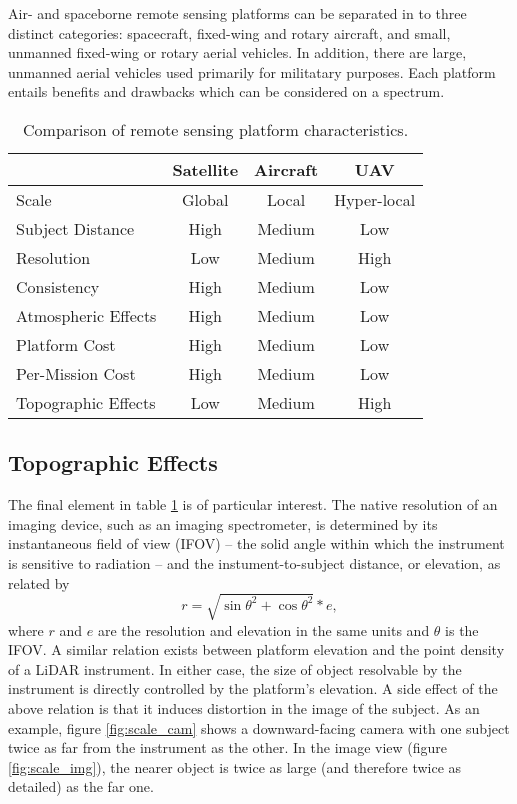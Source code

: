 \documentclass[10pt,a4paper]{report}
\begin{document}
Air- and spaceborne remote sensing platforms can be separated in to three distinct categories: spacecraft, fixed-wing and rotary aircraft, and small, unmanned fixed-wing or rotary aerial vehicles.  In addition, there are large, unmanned aerial vehicles used primarily for militatary purposes. Each platform entails benefits and drawbacks which can be considered on a spectrum.

\begin{table}
\caption{Comparison of remote sensing platform characteristics.}
\label{table:platforms}
\begin{tabular}{l|ccc}
\hline
 & Satellite & Aircraft & UAV \\
\hline
Scale & Global & Local & Hyper-local \\
Subject Distance & High & Medium & Low \\
Resolution & Low & Medium & High \\
Consistency & High & Medium & Low \\
Atmospheric Effects & High & Medium & Low \\
Platform Cost & High & Medium & Low \\
Per-Mission Cost & High & Medium & Low \\
Topographic Effects & Low & Medium & High \\
\hline
\end{tabular}
\end{table}

\subsection{Topographic Effects}

The final element in table \ref{table:platforms} is of particular interest. The native resolution of an imaging device, such as an imaging spectrometer, is determined by its instantaneous field of view (IFOV) -- the solid angle within which the instrument is sensitive to radiation -- and the instument-to-subject distance, or elevation, as related by
\begin{equation}
r = \sqrt{\sin{\theta}^2+\cos{\theta}^2}*e,
\label{eq:ifov}
\end{equation} 
where $r$ and $e$ are the resolution and elevation in the same units and $\theta$ is the IFOV. A similar relation exists between platform elevation and the point density of a LiDAR instrument. In either case, the size of object resolvable by the instrument is directly controlled by the platform's elevation. A side effect of the above relation is that it induces distortion in the image of the subject. As an example, figure \ref{fig:scale_cam} shows a downward-facing camera with one subject twice as far from the instrument as the other. In the image view (figure \ref{fig:scale_img}), the nearer object is twice as large (and therefore twice as detailed) as the far one.
\end{document}
